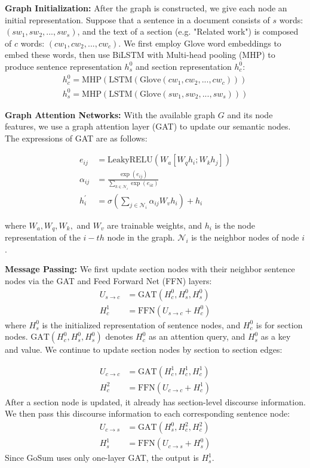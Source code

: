 \noindent \textbf{Graph Initialization:}
After the graph is constructed, we give each node an initial representation.
Suppose that  a sentence in a document consists of $s$ words: $(sw_1,sw_2,...,sw_s)$, and the text of a section (e.g. "Related work") is composed of $c$ words: $(cw_1,cw_2,...,cw_c)$.
We   first employ  Glove\cite{glove_2014} word embeddings to embed these words, then use BiLSTM \cite{lstm_1997} with Multi-head pooling (MHP) to produce sentence representation $h_s^0$ and section representation $h_c^0$:
\begin{align}
    h_c^0 = \text{MHP} (\text{LSTM} ( \text{Glove} (cw_1,cw_2,...,cw_c) ) ) \\
    h_s^0 = \text{MHP} (\text{LSTM} ( \text{Glove} (sw_1,sw_2,...,sw_s) ) )
\end{align}

\noindent \textbf{Graph Attention Networks:}
With the available graph $G$ and its node features, we use a graph attention layer (GAT) \cite{gat_2017} to update our semantic nodes. The expressions of GAT are as follows:

\begin{align}
    e_{ij} &= \text{LeakyRELU} (W_a[W_q h_i; W_k h_j]) \\
    \alpha_{ij} &= \frac{\exp (e_{ij})}{\sum_{k\in \mathcal{N}_i} \exp (e_{ik})} \\
    h_i^{\prime} &= \sigma (\sum_{j\in \mathcal{N}_i} \alpha_{ij} W_v h_i) + h_i
\end{align}

where $W_a, W_q, W_k,$ and $ W_v$ are trainable weights, and $h_i$ is the node representation of the $i-th$ node in the graph. $\mathcal{N}_i$ is the neighbor nodes of node $i$.

\noindent \textbf{Message Passing:} We first update section nodes with their neighbor sentence nodes via the GAT and Feed Forward Net (FFN) layers:
\begin{align}
    U_{s\rightarrow c} &= \text{GAT} ({H}_c^0, {H}_s^0, {H}_s^0) \\
    {H}_c^1 &= \text{FFN}(U_{s\rightarrow c} + {H}_c^0)
\end{align}
where ${H}_s^0$ is the initialized representation of sentence nodes, and ${H}_c^0$ is for section nodes.
 $\text{GAT} ({H}_c^0, {H}_s^0, {H}_s^0)$ denotes ${H}_c^0$ as an attention query, and ${H}_s^0$ as a key and value.
We continue to update section nodes by section to section edges:

\begin{align}
    U_{c\rightarrow c} &= \text{GAT} ({H}_c^1, {H}_c^1, {H}_c^1) \\
    {H}_c^2 &= \text{FFN}(U_{c\rightarrow c} + {H}_c^1)
\end{align} \label{eq:mp3}
After a section node is updated, it already has section-level discourse information. We then pass this discourse information to each corresponding sentence node:
\begin{align}
    U_{c\rightarrow s} &= \text{GAT} ({H}_s^0, {H}_c^2, {H}_c^2) \\
    {H}_s^1 &= \text{FFN}(U_{c\rightarrow s} + {H}_s^0)
\end{align}
Since GoSum uses only one-layer GAT, the output is ${H}_s^1$.


